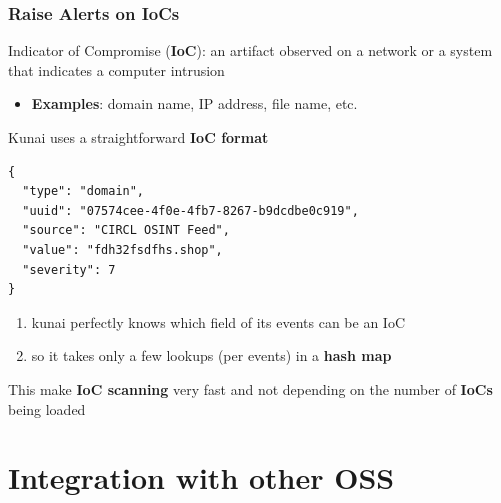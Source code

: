 \documentclass[10pt,aspectratio=169, colorlinks=true, linkcolor=circlBlue]{beamer}
\begin{document}
\begin{frame}[fragile]
	\frametitle{Raise Alerts on IoCs}

	Indicator of Compromise (\textbf{IoC}): an artifact observed on a network or a system that indicates a computer intrusion

	\begin{itemize}
		\item[] \textbf{Examples}: domain name, IP address, file name, etc.
	\end{itemize}

	Kunai uses a straightforward \textbf{IoC format}

	\centering
	\begin{minipage}{0.6\textwidth}
		\begin{verbatim}
{
  "type": "domain",
  "uuid": "07574cee-4f0e-4fb7-8267-b9dcdbe0c919",
  "source": "CIRCL OSINT Feed",
  "value": "fdh32fsdfhs.shop",
  "severity": 7
}
		\end{verbatim}
	\end{minipage}

	\begin{enumerate}

		\item
		      kunai perfectly knows which field of its events can be an IoC
		\item
		      so it takes only a few lookups (per events) in a \textbf{hash map}
	\end{enumerate}

	This make \textbf{IoC scanning} very fast and not depending on the
	number of \textbf{IoCs} being loaded
\end{frame}

\section{Integration with other OSS}
\end{document}
